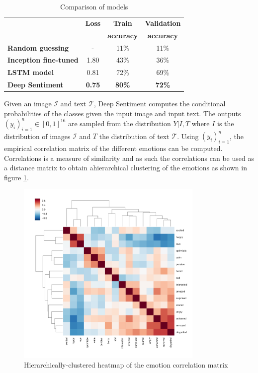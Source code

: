 \documentclass{article} %
\begin{document}
\begin{table}[H]
\caption{Comparison of models}
\begin{center}
    \begin{tabular}{ l | c | c | c}
    & \textbf{Loss} & \textbf{Train} & \textbf{Validation} \\
    & & \textbf{accuracy} & \textbf{accuracy} \\ \hline
    \textbf{Random guessing} & - & 11\% & 11\% \\ \hline
    \textbf{Inception fine-tuned}  & 1.80 & 43\% & 36\% \\ \hline
    \textbf{LSTM model} & 0.81 & 72\% & 69\% \\ \hline
    \textbf{Deep Sentiment} & \textbf{0.75} & \textbf{80\%} & \textbf{72\%} \\
    \end{tabular}
\end{center} 
\label{all-results}
\end{table}

Given an image $\mathcal{I}$ and text $\mathcal{T}$, Deep Sentiment computes the conditional probabilities of the classes given the input image and input text. The outputs $(y_i)_{i=1}^n \in [0,1]^{16}$ are sampled from the distribution $Y| I, T$ where $I$ is the distribution of images $\mathcal{I}$ and $T$ the distribution of text $\mathcal{T}$. Using $(y_i)_{i=1}^n$, the empirical correlation matrix of the different emotions can be computed. Correlations is a measure of similarity and as such the correlations can be used as a distance matrix to obtain ahierarchical clustering of the emotions as shown in figure \ref{dendrogram}.

\begin{figure}[H]
    \centering
    \includegraphics[width=0.8\textwidth]{Images/dendrogram.jpg}
    \caption{Hierarchically-clustered heatmap of the emotion correlation matrix}
    \label{dendrogram}
\end{figure}
\end{document}
